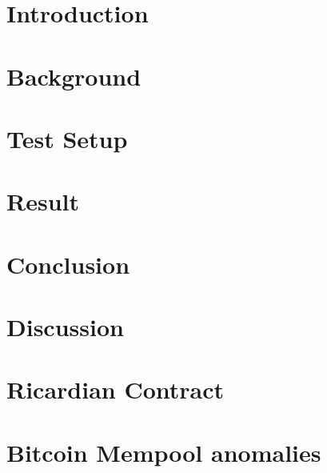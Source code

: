 \documentclass[Nomencl]{DylanMaster}
\begin{document}
\mytitlepage

\newpage

\tableofcontents

\newpage
\section{Introduction}


\newpage
\section{Background}


\newpage
\section{Test Setup}


\newpage
\section{Result}


\newpage
\section{Conclusion}


\newpage
\section{Discussion}


\newpage
\appendix
\section{Ricardian Contract}


\newpage
\section{Bitcoin Mempool anomalies}


\newpage


\end{document}
